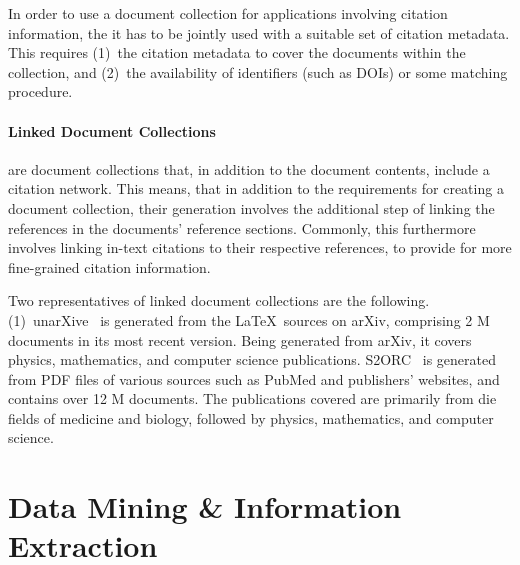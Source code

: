 In order to use a document collection for applications involving citation information, the it has to be jointly used with a suitable set of citation metadata. This requires (1)~the citation metadata to cover the documents within the collection, and (2)~the availability of identifiers (such as DOIs) or some matching procedure.  %

\paragraph{Linked Document Collections}
are document collections that, in addition to the document contents, include a citation network. This means, that in addition to the requirements for creating a document collection, their generation involves the additional step of linking the references in the documents' reference sections. Commonly, this furthermore involves linking in-text citations to their respective references, to provide for more fine-grained citation information.

Two representatives of linked document collections are the following. (1)~unarXive~\cite{Saier2020} is generated from the \LaTeX\ sources on arXiv, comprising 2 M documents in its most recent version. Being generated from arXiv, it covers physics, mathematics, and computer science publications. S2ORC~\cite{Lo2020} is generated from PDF files of various sources such as PubMed and publishers' websites, and contains over 12 M documents. The publications covered are primarily from die fields of medicine and biology, followed by physics, mathematics, and computer science.

\section{Data Mining \& Information Extraction}





